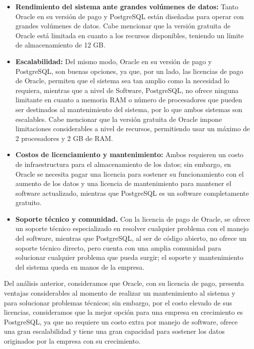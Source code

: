 \begin{itemize}
\item \textbf{Rendimiento del sistema ante grandes volúmenes de datos:} Tanto Oracle en su versión de pago y PostgreSQL están diseñadas para operar con grandes volúmenes de datos. Cabe mencionar que la versión gratuita de Oracle está limitada en cuanto a los recursos disponibles, teniendo un límite de almacenamiento de 12 GB.
\item \textbf{Escalabilidad: } Del mismo modo, Oracle en su versión de pago y PostgreSQL, son buenas opciones, ya que, por un lado, las licencias de pago de Oracle, permiten que el sistema sea tan amplio como la necesidad lo requiera, mientras que a nivel de Software, PostgreSQL, no ofrece ninguna limitante en cuanto a memoria RAM o número de procesadores que pueden ser destinados al mantenimiento del sistema, por lo que ambos sistemas son escalables. Cabe mencionar que la versión gratuita de Oracle impone limitaciones considerables a nivel de recursos, permitiendo usar un máximo de 2 procesadores y 2 GB de RAM.
\item \textbf{Costos de licenciamiento y mantenimiento: } Ambos requieren un costo de infraestructura para el almacenamiento de los datos; sin embargo, en Oracle se necesita pagar una licencia para sostener su funcionamiento con el aumento de los datos y una licencia de mantenimiento para mantener el software actualizado, mientras que PostgreSQL es un software completamente gratuito.\
\item \textbf{Soporte técnico y comunidad.} Con la licencia de pago de Oracle, se ofrece un soporte técnico especializado en resolver cualquier problema con el manejo del software, mientras que PostgreSQL, al ser de código abierto, no ofrece un soporte técnico directo, pero cuenta con una amplia comunidad para solucionar cualquier problema que pueda surgir; el soporte y mantenimiento del sistema queda en manos de la empresa.
\end{itemize}
Del análisis anterior, consideramos que Oracle, con su licencia de pago, presenta ventajas considerables al momento de realizar un mantenimiento al sistema y para solucionar problemas técnicos; sin embargo, por el costo elevado de sus licencias, consideramos que la mejor opción para una empresa en crecimiento es PostgreSQL, ya que no requiere un costo extra por manejo de software, ofrece una gran escalabilidad y tiene una gran capacidad para sostener los datos originados por la empresa con su crecimiento.

